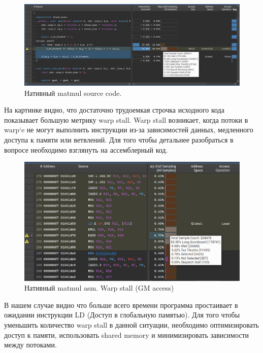 \documentclass[a4paper,12pt]{article}
\begin{document}
\begin{figure}[h]
  \centering
  \includegraphics[width=1.0\textwidth]{img/native_warpstall.png}
  \caption{Нативный matmul source code.}
  \label{fig:image_label}
\end{figure}

На картинке видно, что достаточно трудоемкая строчка исходного кода показывает большую метрику warp stall.
Warp stall возникает, когда потоки в warp`e не могут выполнить инструкции 
из-за зависимостей данных, медленного доступа к памяти или ветвлений. 
Для того чтобы детальнее разобраться в вопросе необходимо взглянуть на 
ассемблерный код.

\newpage

\begin{figure}[h]
  \centering
  \includegraphics[width=1.0\textwidth]{img/native_asm.png}
  \caption{Нативный matmul asm. Warp stall (GM access)}
  \label{fig:image_label}
\end{figure}


В нашем случае видно что больше всего времени программа простаивает в ожидании инструкции LD (Доступ в глобальную памятью).
Для того чтобы уменьшить количество warp stall в данной ситуации, необходимо оптимизировать доступ к памяти, 
использовать shared memory и минимизировать зависимости между потоками.
\end{document}
